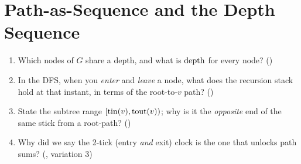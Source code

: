 \section{Path-as-Sequence and the Depth Sequence}\label{sec:c24-path}

\begin{previouslybox}
\begin{enumerate}[nosep, leftmargin=1.6em]
  \item Which nodes of $G$ share a depth, and what is $\operatorname{depth}$ for every node? ()
  \item In the DFS, when you \emph{enter} and \emph{leave} a node, what does the recursion
        stack hold at that instant, in terms of the root-to-$v$ path? ()
  \item State the subtree range $[\operatorname{tin}(v), \operatorname{tout}(v))$; why is it the \emph{opposite} end of
        the same stick from a root-path? ()
  \item Why did we say the 2-tick (entry \emph{and} exit) clock is the one that unlocks path
        sums? (, variation 3)
\end{enumerate}
\end{previouslybox}

